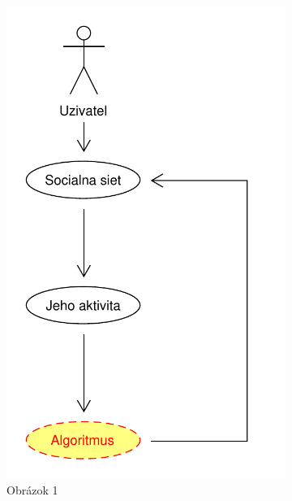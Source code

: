 \documentclass[10pt,twoside,slovak,a4paper]{article}
\begin{document}
\begin{figure}[H]
    \centering
    \begin{subfigure}{0.45\textwidth}
        \centering
        \includegraphics[width=\linewidth]{diagram2.pdf}
        \caption{Obrázok 1}
        \label{fig:obrazok1}
    \end{subfigure}
    \hfill
    \begin{subfigure}{0.45\textwidth}
        \centering

\end{subfigure}
\end{figure}
\end{document}
